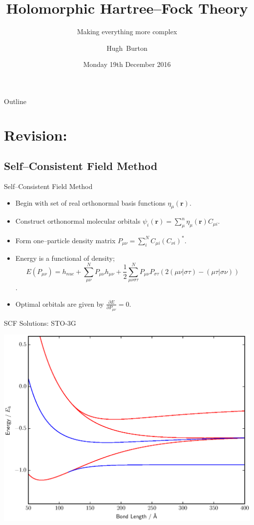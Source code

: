 \documentclass{beamer}
\title[Holomorphic Hartree--Fock Theory]
{%
  Holomorphic Hartree--Fock Theory
}
\subtitle{Making everything more complex}
\author[Burton, Thom]
{
  \hskip-1.7mm
  Hugh~Burton %
}
\institute[Burton and others]
{
  University of Cambridge
}
\date[December 2016]{Monday 19th December 2016}
\newcommand{\dbd}[2] {{\frac{\partial #1}{\partial #2}}}
\begin{document}
\begin{frame}
  \titlepage
\end{frame}

\begin{frame}{Outline}
  \tableofcontents
\end{frame}

\section{Revision:}

\subsection{Self--Consistent Field Method}
\begin{frame}{Self--Consistent Field Method}
 \begin{itemize}
  \item Begin with set of real orthonormal basis functions $\eta_\mu (\mathbf{r})$.
  \item Construct orthonormal molecular orbitals $\psi_i(\mathbf{r}) = \sum_\mu^n \eta_\mu (\mathbf{r}) C_{\mu i}$.
  \item Form one--particle density matrix $P_{\mu\nu}=\sum_i^N C_{\mu i} (C_{\nu i})^{*}$.
  \item Energy is a functional of density;
  $$E(P_{\mu\nu}) = h_{nuc} + \sum_{\mu\nu}^N P_{\mu\nu} h_{\mu\nu} + \frac{1}{2} \sum_{\mu\nu\sigma\tau}^N P_{\mu\nu} P_{\sigma\tau} \left(2\left(\mu\nu|\sigma\tau\right) - \left(\mu\tau|\sigma\nu\right)\right)$$.
  \item Optimal orbitals are given by $\dbd{E}{P_{\mu\nu}}=0$.
 \end{itemize}
\end{frame} 

\begin{frame}{SCF Solutions:  STO-3G}
  \begin{center}
    \includegraphics[scale=0.4]{20161219_ThomGroup_Update/normal_UHF_HH_sto-3g}
  \end{center}
\end{frame}
\end{document}
